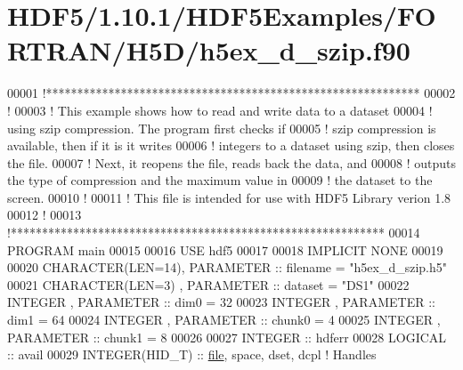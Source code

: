 \hypertarget{_h_d_f5_21_810_81_2_h_d_f5_examples_2_f_o_r_t_r_a_n_2_h5_d_2h5ex__d__szip_8f90_source}{}\section{H\+D\+F5/1.10.1/\+H\+D\+F5\+Examples/\+F\+O\+R\+T\+R\+A\+N/\+H5\+D/h5ex\+\_\+d\+\_\+szip.f90}
\label{_h_d_f5_21_810_81_2_h_d_f5_examples_2_f_o_r_t_r_a_n_2_h5_d_2h5ex__d__szip_8f90_source}

\begin{DoxyCode}
00001 \textcolor{comment}{!************************************************************}
00002 \textcolor{comment}{!}
00003 \textcolor{comment}{!  This example shows how to read and write data to a dataset}
00004 \textcolor{comment}{!  using szip compression.    The program first checks if}
00005 \textcolor{comment}{!  szip compression is available, then if it is it writes}
00006 \textcolor{comment}{!  integers to a dataset using szip, then closes the file.}
00007 \textcolor{comment}{!  Next, it reopens the file, reads back the data, and}
00008 \textcolor{comment}{!  outputs the type of compression and the maximum value in}
00009 \textcolor{comment}{!  the dataset to the screen.}
00010 \textcolor{comment}{!}
00011 \textcolor{comment}{!  This file is intended for use with HDF5 Library verion 1.8}
00012 \textcolor{comment}{!}
00013 \textcolor{comment}{!************************************************************}
00014 \textcolor{keyword}{PROGRAM} main
00015 
00016   \textcolor{keywordtype}{USE }hdf5
00017 
00018   \textcolor{keywordtype}{IMPLICIT NONE}
00019 
00020   \textcolor{keywordtype}{CHARACTER(LEN=14)}, \textcolor{keywordtype}{PARAMETER} :: filename = \textcolor{stringliteral}{"h5ex\_d\_szip.h5"}
00021   \textcolor{keywordtype}{CHARACTER(LEN=3)} , \textcolor{keywordtype}{PARAMETER} :: dataset  = \textcolor{stringliteral}{"DS1"}
00022   \textcolor{keywordtype}{INTEGER}          , \textcolor{keywordtype}{PARAMETER} :: dim0     = 32
00023   \textcolor{keywordtype}{INTEGER}          , \textcolor{keywordtype}{PARAMETER} :: dim1     = 64
00024   \textcolor{keywordtype}{INTEGER}          , \textcolor{keywordtype}{PARAMETER} :: chunk0   = 4
00025   \textcolor{keywordtype}{INTEGER}          , \textcolor{keywordtype}{PARAMETER} :: chunk1   = 8
00026 
00027   \textcolor{keywordtype}{INTEGER} :: hdferr
00028   \textcolor{keywordtype}{LOGICAL}         :: avail
00029   \textcolor{keywordtype}{INTEGER(HID\_T)}  :: \hyperlink{structfile}{file}, space, dset, dcpl \textcolor{comment}{! Handles}

\end{DoxyCode}
